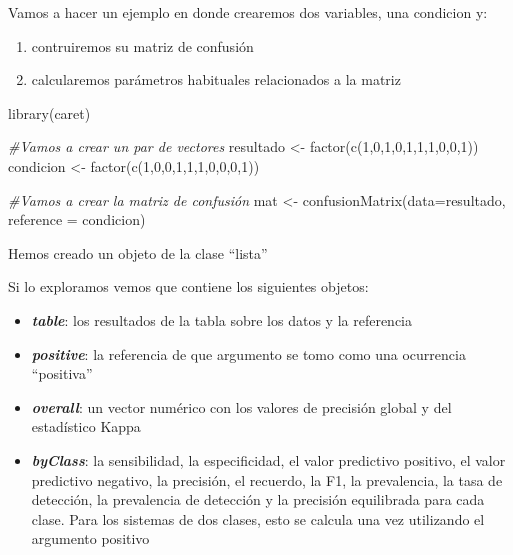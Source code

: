 \documentclass[
]{book}
\newenvironment{Shaded}{\begin{snugshade}}{\end{snugshade}}
\newcommand{\AttributeTok}[1]{\textcolor[rgb]{0.77,0.63,0.00}{#1}}
\newcommand{\CommentTok}[1]{\textcolor[rgb]{0.56,0.35,0.01}{\textit{#1}}}
\newcommand{\DecValTok}[1]{\textcolor[rgb]{0.00,0.00,0.81}{#1}}
\newcommand{\FunctionTok}[1]{\textcolor[rgb]{0.00,0.00,0.00}{#1}}
\newcommand{\NormalTok}[1]{#1}
\newcommand{\OtherTok}[1]{\textcolor[rgb]{0.56,0.35,0.01}{#1}}
\begin{document}
Vamos a hacer un ejemplo en donde crearemos dos variables, una condicion y:

\begin{enumerate}
\def\labelenumi{\alph{enumi})}
\item
  contruiremos su matriz de confusión
\item
  calcularemos parámetros habituales relacionados a la matriz
\end{enumerate}

\begin{Shaded}
\begin{Highlighting}[]
\FunctionTok{library}\NormalTok{(caret)}
 
\CommentTok{\#Vamos a crear un par de vectores}
\NormalTok{resultado }\OtherTok{\textless{}{-}} \FunctionTok{factor}\NormalTok{(}\FunctionTok{c}\NormalTok{(}\DecValTok{1}\NormalTok{,}\DecValTok{0}\NormalTok{,}\DecValTok{1}\NormalTok{,}\DecValTok{0}\NormalTok{,}\DecValTok{1}\NormalTok{,}\DecValTok{1}\NormalTok{,}\DecValTok{1}\NormalTok{,}\DecValTok{0}\NormalTok{,}\DecValTok{0}\NormalTok{,}\DecValTok{1}\NormalTok{))}
\NormalTok{condicion }\OtherTok{\textless{}{-}} \FunctionTok{factor}\NormalTok{(}\FunctionTok{c}\NormalTok{(}\DecValTok{1}\NormalTok{,}\DecValTok{0}\NormalTok{,}\DecValTok{0}\NormalTok{,}\DecValTok{1}\NormalTok{,}\DecValTok{1}\NormalTok{,}\DecValTok{1}\NormalTok{,}\DecValTok{0}\NormalTok{,}\DecValTok{0}\NormalTok{,}\DecValTok{0}\NormalTok{,}\DecValTok{1}\NormalTok{))}
 
\CommentTok{\#Vamos a crear la matriz de confusión}
\NormalTok{mat }\OtherTok{\textless{}{-}} \FunctionTok{confusionMatrix}\NormalTok{(}\AttributeTok{data=}\NormalTok{resultado, }\AttributeTok{reference =}\NormalTok{ condicion)}
\end{Highlighting}
\end{Shaded}

Hemos creado un objeto de la clase ``lista''

Si lo exploramos vemos que contiene los siguientes objetos:

\begin{itemize}
\item
  \textbf{\emph{table}}: los resultados de la tabla sobre los datos y la referencia
\item
  \textbf{\emph{positive}}: la referencia de que argumento se tomo como una ocurrencia ``positiva''
\item
  \textbf{\emph{overall}}: un vector numérico con los valores de precisión global y del estadístico Kappa
\item
  \textbf{\emph{byClass}}: la sensibilidad, la especificidad, el valor predictivo positivo, el valor predictivo negativo, la precisión, el recuerdo, la F1, la prevalencia, la tasa de detección, la prevalencia de detección y la precisión equilibrada para cada clase. Para los sistemas de dos clases, esto se calcula una vez utilizando el argumento positivo
\end{itemize}
\end{document}
